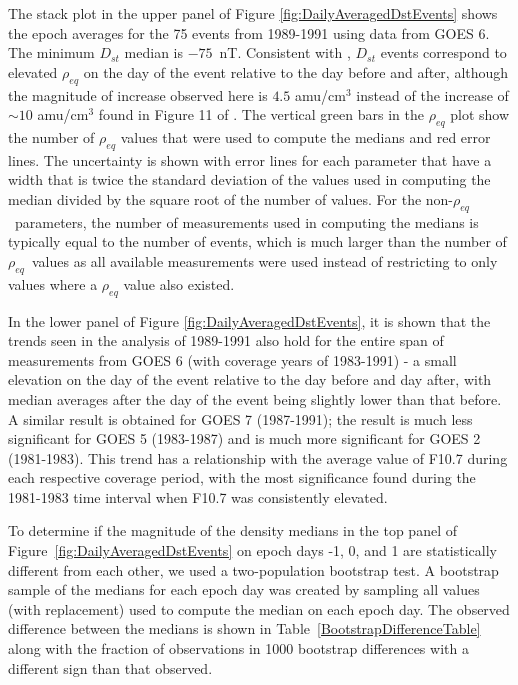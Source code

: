 \documentclass[draft,linenumbers]{agujournal}
\begin{document}
The stack plot in the upper panel of Figure \ref{fig:DailyAveragedDstEvents} shows the epoch averages for the 75 events from 1989-1991 using data from GOES 6.  The minimum $D_{st}$ median is $-75$~nT.  Consistent with \citet{Takahashi2010}, $D_{st}$ events correspond to elevated $\rho_{eq}$ on the day of the event relative to the day before and after, although the magnitude of increase observed here is $4.5$ amu/cm$^3$ instead of the increase of ${\sim} 10$ amu/cm$^3$ found in Figure 11 of \citet{Takahashi2010}.  The vertical green bars in the $\rho_{eq}$ plot show the number of $\rho_{eq}$ values that were used to compute the medians and red error lines.  The uncertainty is shown with error lines for each parameter that have a width that is twice the standard deviation of the values used in computing the median divided by the square root of the number of values. For the non-$\rho_{eq}$\ parameters, the number of measurements used in computing the medians is typically equal to the number of events, which is much larger than the number of $\rho_{eq}$\ values as all available measurements were used instead of restricting to only values where a $\rho_{eq}$ value also existed.

In the lower panel of Figure \ref{fig:DailyAveragedDstEvents}, it is shown that the trends seen in the analysis of 1989-1991 also hold for the entire span of measurements from GOES 6 (with coverage years of 1983-1991) - a small elevation on the day of the event relative to the day before and day after, with median averages after the day of the event being slightly lower than that before.  A similar result is obtained for GOES 7 (1987-1991); the result is much less significant for GOES 5 (1983-1987) and is much more significant for GOES 2 (1981-1983).  This trend has a relationship with the average value of F10.7 during each respective coverage period, with the most significance found during the 1981-1983 time interval when F10.7 was consistently elevated.

To determine if the magnitude of the density medians in the top panel of Figure~\ref{fig:DailyAveragedDstEvents} on epoch days -1, 0, and 1 are statistically different from each other, we used a two-population bootstrap test.  A bootstrap sample of the medians for each epoch day was created by sampling all values (with replacement) used to compute the median on each epoch day.  The observed difference between the medians is shown in Table~\ref{BootstrapDifferenceTable} along with the fraction of observations in 1000 bootstrap differences with a different sign than that observed. 
\end{document}
